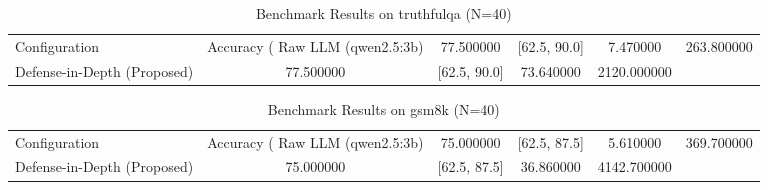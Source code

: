\begin{table}
\caption{Benchmark Results on truthfulqa (N=40)}
\label{tab:truthfulqa_benchmark}
\begin{tabular}{lcccc}
\toprule
Configuration & Accuracy (%
\midrule
Raw LLM (qwen2.5:3b) & 77.500000 & [62.5, 90.0] & 7.470000 & 263.800000 \\
Defense-in-Depth (Proposed) & 77.500000 & [62.5, 90.0] & 73.640000 & 2120.000000 \\
\bottomrule
\end{tabular}
\end{table}

\begin{table}
\caption{Benchmark Results on gsm8k (N=40)}
\label{tab:gsm8k_benchmark}
\begin{tabular}{lcccc}
\toprule
Configuration & Accuracy (%
\midrule
Raw LLM (qwen2.5:3b) & 75.000000 & [62.5, 87.5] & 5.610000 & 369.700000 \\
Defense-in-Depth (Proposed) & 75.000000 & [62.5, 87.5] & 36.860000 & 4142.700000 \\
\bottomrule
\end{tabular}
\end{table}

